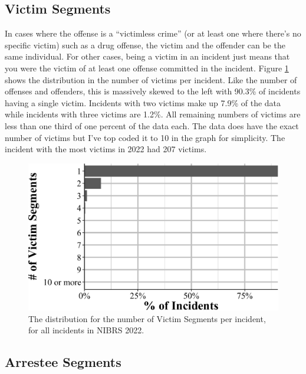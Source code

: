 \documentclass[
  12pt,
  openany]{book}
\begin{document}
\subsection{Victim Segments}\label{victim-segments}

In cases where the offense is a ``victimless crime'' (or at least one where there's no specific victim) such as a drug offense, the victim and the offender can be the same individual. For other cases, being a victim in an incident just means that you were the victim of at least one offense committed in the incident. Figure \ref{fig:administrativeVictimSegments} shows the distribution in the number of victims per incident. Like the number of offenses and offenders, this is massively skewed to the left with 90.3\% of incidents having a single victim. Incidents with two victims make up 7.9\% of the data while incidents with three victims are 1.2\%. All remaining numbers of victims are less than one third of one percent of the data each. The data does have the exact number of victims but I've top coded it to 10 in the graph for simplicity. The incident with the most victims in 2022 had 207 victims.

\begin{figure}

{\centering \includegraphics[width=0.9\linewidth]{12_nibrs_administrative_files/figure-latex/administrativeVictimSegments-1} 

}

\caption{The distribution for the number of Victim Segments per incident, for all incidents in NIBRS 2022.}\label{fig:administrativeVictimSegments}
\end{figure}

\subsection{Arrestee Segments}\label{arrestee-segments}
\end{document}
